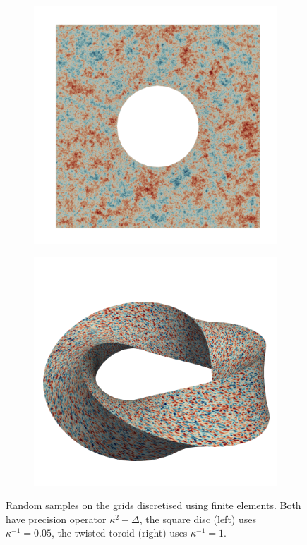 \documentclass[
fontsize=11pt,
paper=a4,
numbers=noenddot
]{scrartcl}
\begin{document}
\begin{figure}[htbp]
    \centering
    \begin{subfigure}[b]{0.49\textwidth}
        \centering
        \includegraphics[width=\textwidth]{plots/paraview/square-disc_0_05.png}
    \end{subfigure}
    \hfill
    \begin{subfigure}[b]{0.49\textwidth}
        \centering
        \includegraphics[width=\textwidth]{plots/paraview/toroid_1.png}
      \end{subfigure}
      \caption{Random samples on the grids discretised using finite elements. Both have precision operator $\kappa^2 - \Delta $, the square disc (left) uses $\kappa^{-1} = 0.05$, the twisted toroid (right) uses $\kappa^{-1} = 1$.}
    \label{fig:mfem_ex}
\end{figure}
\end{document}
